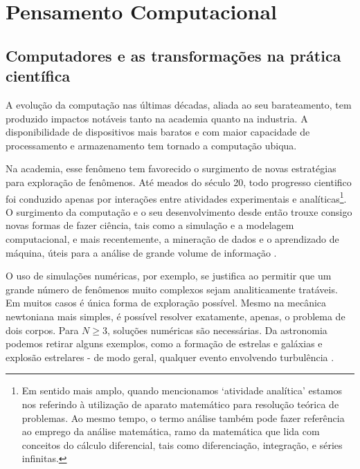\chapter{Pensamento Computacional}\label{pensamento-computacional}

\section{Computadores e as transformações na prática científica}




A evolução da computação nas últimas décadas, aliada ao seu barateamento, tem produzido impactos notáveis tanto na academia quanto na industria. A disponibilidade de dispositivos mais baratos e com maior capacidade de processamento e armazenamento tem tornado a computação ubiqua. 


Na academia, esse fenômeno tem favorecido o surgimento de novas estratégias para exploração de fenômenos. Até meados do século 20, todo progresso cientifico foi conduzido apenas por interações entre atividades experimentais e analíticas\footnote{
Em sentido mais amplo, quando mencionamos `atividade analítica' estamos nos referindo à utilização de aparato matemático para resolução teórica de problemas. Ao mesmo tempo, o termo análise também pode fazer referência ao emprego da análise matemática, ramo da matemática que lida com conceitos do cálculo diferencial, tais como diferenciação, integração, e séries infinitas.}. O surgimento da computação e o seu desenvolvimento desde então trouxe consigo novas formas de fazer ciência, tais como a simulação e a modelagem computacional, e mais recentemente, a mineração de dados e o aprendizado de máquina, úteis para a análise de grande volume de informação \cite{Djorgovski2005, wing2006}. %


O uso de simulações numéricas, por exemplo, se justifica ao permitir que um grande número de fenômenos muito complexos sejam analiticamente tratáveis. Em muitos casos é única forma de exploração possível. Mesmo na mecânica newtoniana mais simples, é possível resolver  exatamente, apenas, o problema de dois corpos. Para $N\geq3$, soluções numéricas são necessárias. Da astronomia podemos retirar alguns exemplos, como a formação de estrelas e galáxias e explosão estrelares - de modo geral, qualquer evento envolvendo turbulência  \cite[]{Djorgovski2005}. %

